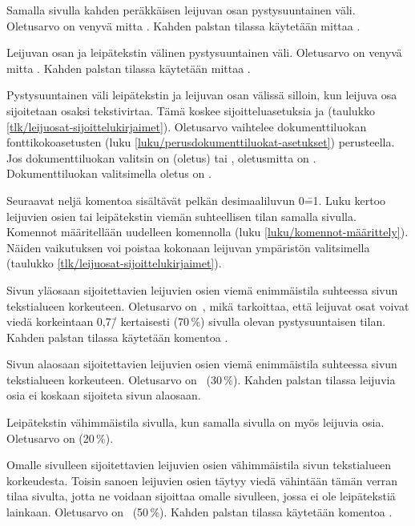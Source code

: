 \begin{maaritelma}{}
\item [floatsep] Samalla sivulla kahden peräkkäisen leijuvan osan
  pystysuuntainen väli. Oletusarvo on venyvä mitta . Kahden palstan tilassa käytetään mittaa
  .
\item [textfloatsep] Leijuvan osan ja leipätekstin välinen
  pystysuuntainen väli. Oletusarvo on venyvä mitta . Kahden palstan tilassa käytetään mittaa
  .
\item [intextsep] Pystysuuntainen väli leipätekstin ja leijuvan osan
  välissä silloin, kun leijuva osa sijoitetaan osaksi tekstivirtaa. Tämä
  koskee sijoitteluasetuksia  ja  (taulukko
  \ref{tlk/leijuosat-sijoittelukirjaimet}). Oletusarvo vaihtelee
  dokumenttiluokan fonttikokoasetusten (luku
  \ref{luku/perusdokumenttiluokat-asetukset}) perusteella. Jos
  dokumenttiluokan valitsin on \koodi{10pt} (oletus) tai \koodi{11pt},
  oletusmitta on . Dokumenttiluokan
  valitsimella \koodi{12pt} oletus on .
\end{maaritelma}

\noindent
Seuraavat neljä komentoa sisältävät pelkän desimaaliluvun 0\==1. Luku
kertoo leijuvien osien tai leipätekstin viemän suhteellisen tilan
samalla sivulla. Komennot määritellään uudelleen komennolla
 (luku \ref{luku/komennot-määrittely}). Näiden
vaikutuksen voi poistaa kokonaan leijuvan ympäristön valitsimella
\koodi{!} (taulukko \ref{tlk/leijuosat-sijoittelukirjaimet}).

\begin{maaritelma}{}
\item [topfraction] Sivun yläosaan sijoitettavien leijuvien osien viemä
  enimmäistila suhteessa sivun tekstialueen korkeuteen. Oletusarvo
  on~, mikä tarkoittaa, että leijuvat osat voivat viedä
  korkeintaan 0,7\=/ kertaisesti (70\,\%) sivulla olevan pystysuuntaisen
  tilan. Kahden palstan tilassa käytetään komentoa
  .
\item [bottomfraction] Sivun alaosaan sijoitettavien leijuvien osien
  viemä enimmäistila suhteessa sivun tekstialueen korkeuteen. Oletusarvo
  on~ (30\,\%). Kahden palstan tilassa leijuvia osia ei
  koskaan sijoiteta sivun alaosaan.
\item [textfraction] Leipätekstin vähimmäistila sivulla, kun samalla
  sivulla on myös leijuvia osia. Oletusarvo on  (20\,\%).
\item [floatpagefraction] Omalle sivulleen sijoitettavien leijuvien
  osien vähimmäistila sivun tekstialueen korkeudesta. Toisin sanoen
  leijuvien osien täytyy viedä vähintään tämän verran tilaa sivulta,
  jotta ne voidaan sijoittaa omalle sivulleen, jossa ei ole leipätekstiä
  lainkaan. Oletusarvo on~ (50\,\%). Kahden palstan tilassa
  käytetään komentoa .
\end{maaritelma}

